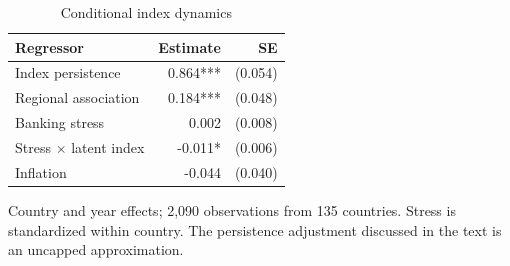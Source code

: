 \begin{table}[!htbp]
\centering\small
\caption{Conditional index dynamics}\label{tab:state}
\begin{tabular}{lrr}\toprule
Regressor & Estimate & SE \\
\midrule
Index persistence & 0.864*** & (0.054) \\
Regional association & 0.184*** & (0.048) \\
Banking stress & 0.002 & (0.008) \\
Stress $\times$ latent index & -0.011* & (0.006) \\
Inflation & -0.044 & (0.040) \\
\bottomrule\end{tabular}
\par\smallskip\begin{minipage}{0.98\linewidth}\footnotesize Country and year effects; 2,090 observations from 135 countries. Stress is standardized within country. The persistence adjustment discussed in the text is an uncapped approximation.\end{minipage}
\end{table}

